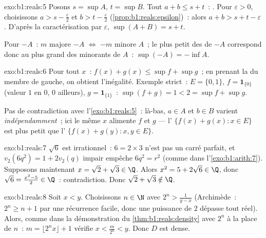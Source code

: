 \begin{solution}{exo:b1:reals:5}
Posons $s = \sup A$, $t = \sup B$. Tout $a + b \leq s + t$~:
. Pour $\varepsilon > 0$, choisissons $a > s -
\frac\varepsilon2$ et $b > t - \frac\varepsilon2$
(\cref{prop:b1:reals:epsilon})~: alors $a + b > s + t - \varepsilon$.
D'après la caractérisation par $\varepsilon$, $\sup(A+B) = s + t$.

Pour $-A$~: $m$ majore $-A$ $\iff$ $-m$ minore $A$~; le plus petit
des  de $-A$ correspond donc au plus grand des minorants de
$A$~: $\sup(-A) = -\inf A$.
\end{solution}

\begin{solution}{exo:b1:reals:6}
Pour tout $x$~: $f(x) + g(x) \leq \sup f + \sup g$~; en prenant la
 du membre de gauche, on obtient l'inégalité. Exemple
strict~: $E = \{0, 1\}$, $f = \mathbf{1}_{\{0\}}$ (valeur $1$ en $0$,
$0$ ailleurs), $g = \mathbf{1}_{\{1\}}$~: $\sup(f + g) = 1 < 2 = \sup
f + \sup g$.

Pas de contradiction avec l'\cref{exo:b1:reals:5}~: là-bas, $a \in A$
et $b \in B$ varient \emph{indépendamment}~; ici le même $x$ alimente
$f$ et $g$ --- l' $\{f(x) + g(x) : x \in E\}$ est plus petit
que l' $\{f(x) + g(y) : x, y \in E\}$.
\end{solution}

\begin{solution}{exo:b1:reals:7}
$\sqrt 6$ est irrationnel~: $6 = 2 \times 3$ n'est pas un carré
parfait, et $v_2(6q^2) = 1 + 2v_2(q)$ impair empêche $6q^2 = r^2$
(comme dans l'\cref{exo:b1:arith:7}). Supposons maintenant $x = \sqrt
2 + \sqrt 3 \in \Q$. Alors $x^2 = 5 + 2\sqrt 6 \in \Q$, donc $\sqrt 6
= \frac{x^2 - 5}{2} \in \Q$~: contradiction. Donc $\sqrt 2 + \sqrt 3
\notin \Q$.
\end{solution}

\begin{solution}{exo:b1:reals:8}
Soit $x < y$. Choisissons $n \in \N$ avec $2^n > \frac{1}{y - x}$
(Archimède~: $2^n \geq n + 1$ par une récurrence facile, donc une
puissance de $2$ dépasse tout réel). Alors, comme dans la
démonstration du \cref{thm:b1:reals:density} avec $2^n$ à la place de
$n$~: $m = \lfloor 2^n x \rfloor + 1$ vérifie $x < \frac{m}{2^n} < y$.
Donc $D$ est dense.
\end{solution}

